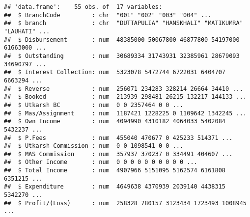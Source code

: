 \documentclass[]{article}
\newenvironment{Shaded}{\begin{snugshade}}{\end{snugshade}}
\newcommand{\KeywordTok}[1]{\textcolor[rgb]{0.13,0.29,0.53}{\textbf{#1}}}
\newcommand{\DataTypeTok}[1]{\textcolor[rgb]{0.13,0.29,0.53}{#1}}
\newcommand{\DecValTok}[1]{\textcolor[rgb]{0.00,0.00,0.81}{#1}}
\newcommand{\StringTok}[1]{\textcolor[rgb]{0.31,0.60,0.02}{#1}}
\newcommand{\CommentTok}[1]{\textcolor[rgb]{0.56,0.35,0.01}{\textit{#1}}}
\newcommand{\OperatorTok}[1]{\textcolor[rgb]{0.81,0.36,0.00}{\textbf{#1}}}
\newcommand{\NormalTok}[1]{#1}
\begin{document}
\begin{verbatim}
## 'data.frame':    55 obs. of  17 variables:
##  $ BranchCode         : chr  "001" "002" "003" "004" ...
##  $ branch             : chr  "DUTTAPULIA" "HANSKHALI" "MATIKUMRA" "LAUHATI" ...
##  $ Disbursement       : num  48385000 50067800 46877800 54197000 61663000 ...
##  $ Outstanding        : num  30689334 31743931 32385961 28679093 34690797 ...
##  $ Interest Collection: num  5323078 5472744 6722031 6404707 6663294 ...
##  $ Reverse            : num  256071 234283 328214 26664 34410 ...
##  $ Booked             : num  213939 298481 26215 132217 144133 ...
##  $ Utkarsh BC         : num  0 0 2357464 0 0 ...
##  $ Mas/Assignment     : num  1187421 1228225 0 1109642 1342245 ...
##  $ Own Income         : num  4094990 4310182 4064033 5402084 5432237 ...
##  $ P.Fees             : num  455040 470677 0 425233 514371 ...
##  $ Utkarsh Commission : num  0 0 1098541 0 0 ...
##  $ MAS Commission     : num  357937 370237 0 334491 404607 ...
##  $ Other Income       : num  0 0 0 0 0 0 0 0 0 0 ...
##  $ Total Income       : num  4907966 5151095 5162574 6161808 6351215 ...
##  $ Expenditure        : num  4649638 4370939 2039140 4438315 5342270 ...
##  $ Profit/(Loss)      : num  258328 780157 3123434 1723493 1008945 ...
\end{verbatim}

\begin{Shaded}
\end{Shaded}
\end{document}
